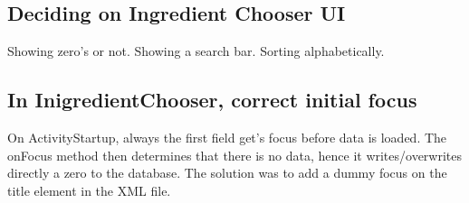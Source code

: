 \documentclass[a4paper,11pt,twoside]{article}
\begin{document}
\subsection{Deciding on Ingredient Chooser UI}
Showing zero's or not. Showing a search bar. Sorting alphabetically.

\subsection{In InigredientChooser, correct initial focus}
On ActivityStartup, always the first field get's focus before data is loaded.
The onFocus method then determines that there is no data, hence it writes/overwrites
directly a zero to the database. The solution was to add a dummy focus on the
title element in the XML file.



\end{document}
